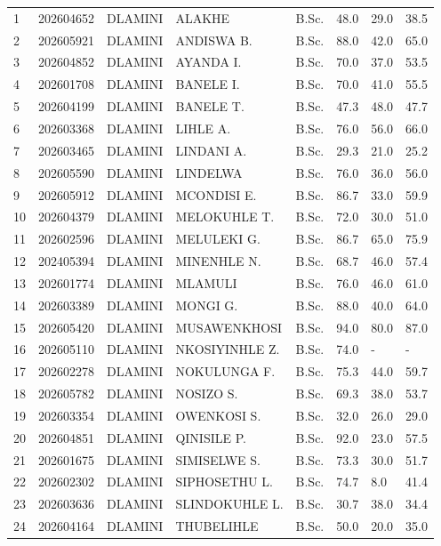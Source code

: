 \documentclass[12pt]{article}
\begin{document}
\begin{longtable}{@{}llllllll@{}}
1 & 202604652 & DLAMINI & ALAKHE & B.Sc. & 48.0 & 29.0 & 38.5 \\
2 & 202605921 & DLAMINI & ANDISWA B. & B.Sc. & 88.0 & 42.0 & 65.0 \\
3 & 202604852 & DLAMINI & AYANDA I. & B.Sc. & 70.0 & 37.0 & 53.5 \\
4 & 202601708 & DLAMINI & BANELE I. & B.Sc. & 70.0 & 41.0 & 55.5 \\
5 & 202604199 & DLAMINI & BANELE T. & B.Sc. & 47.3 & 48.0 & 47.7 \\
6 & 202603368 & DLAMINI & LIHLE A. & B.Sc. & 76.0 & 56.0 & 66.0 \\
7 & 202603465 & DLAMINI & LINDANI A. & B.Sc. & 29.3 & 21.0 & 25.2 \\
8 & 202605590 & DLAMINI & LINDELWA & B.Sc. & 76.0 & 36.0 & 56.0 \\
9 & 202605912 & DLAMINI & MCONDISI E. & B.Sc. & 86.7 & 33.0 & 59.9 \\
10 & 202604379 & DLAMINI & MELOKUHLE T. & B.Sc. & 72.0 & 30.0 & 51.0 \\
11 & 202602596 & DLAMINI & MELULEKI G. & B.Sc. & 86.7 & 65.0 & 75.9 \\
12 & 202405394 & DLAMINI & MINENHLE N. & B.Sc. & 68.7 & 46.0 & 57.4 \\
13 & 202601774 & DLAMINI & MLAMULI & B.Sc. & 76.0 & 46.0 & 61.0 \\
14 & 202603389 & DLAMINI & MONGI G. & B.Sc. & 88.0 & 40.0 & 64.0 \\
15 & 202605420 & DLAMINI & MUSAWENKHOSI & B.Sc. & 94.0 & 80.0 & 87.0 \\
16 & 202605110 & DLAMINI & NKOSIYINHLE Z. & B.Sc. & 74.0 & - & - \\
17 & 202602278 & DLAMINI & NOKULUNGA F. & B.Sc. & 75.3 & 44.0 & 59.7 \\
18 & 202605782 & DLAMINI & NOSIZO S. & B.Sc. & 69.3 & 38.0 & 53.7 \\
19 & 202603354 & DLAMINI & OWENKOSI S. & B.Sc. & 32.0 & 26.0 & 29.0 \\
20 & 202604851 & DLAMINI & QINISILE P. & B.Sc. & 92.0 & 23.0 & 57.5 \\
21 & 202601675 & DLAMINI & SIMISELWE S. & B.Sc. & 73.3 & 30.0 & 51.7 \\
22 & 202602302 & DLAMINI & SIPHOSETHU L. & B.Sc. & 74.7 & 8.0 & 41.4 \\
23 & 202603636 & DLAMINI & SLINDOKUHLE L. & B.Sc. & 30.7 & 38.0 & 34.4 \\
24 & 202604164 & DLAMINI & THUBELIHLE & B.Sc. & 50.0 & 20.0 & 35.0 \\

\end{longtable}
\end{document}

